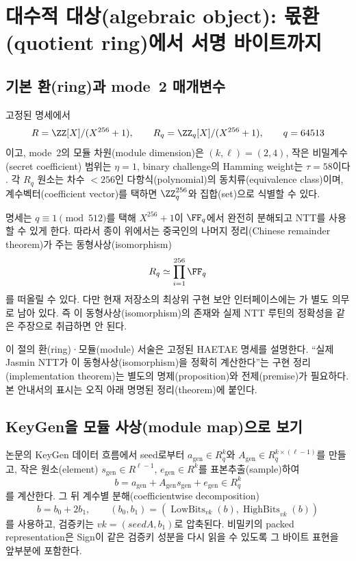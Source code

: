 \section{대수적 대상(algebraic object): 몫환(quotient ring)에서 서명 바이트까지}
\label{sec:algebraic-object}

\subsection{기본 환(ring)과 mode~2 매개변수}

고정된 명세에서
\[
  R=\ZZ[X]/(X^{256}+1),\qquad
  R_q=\ZZ_q[X]/(X^{256}+1),\qquad q=64513
\]
이고, mode~2의 모듈 차원(module dimension)은 \((k,\ell)=(2,4)\), 작은
비밀계수(secret coefficient) 범위는
\(\eta=1\), binary challenge의 Hamming weight는 \(\tau=58\)이다
\cite{haetae-spec}. 각 \(R_q\) 원소는 차수 \(<256\)인 다항식(polynomial)의
동치류(equivalence class)이며, 계수벡터(coefficient vector)를 택하면
\(\ZZ_q^{256}\)와 집합(set)으로 식별할 수 있다.

명세는 \(q\equiv1\pmod{512}\)를 택해 \(X^{256}+1\)이 \(\FF_q\)에서 완전히
분해되고 NTT를 사용할 수 있게 한다. 따라서 종이 위에서는
중국인의 나머지 정리(Chinese remainder theorem)가 주는 동형사상(isomorphism)
\[
  R_q\simeq\prod_{i=1}^{256}\FF_q
\]
를 떠올릴 수 있다. 다만 현재 저장소의 최상위 구현 보안 인터페이스에는
가 별도 의무로 남아 있다. 즉 이
동형사상(isomorphism)의 존재와 실제 NTT 루틴의 정확성을 같은 주장으로
취급하면 안 된다.

\begin{caution}
이 절의 환(ring)·모듈(module) 서술은 고정된 HAETAE 명세를 설명한다. ``실제
Jasmin NTT가 이 동형사상(isomorphism)을 정확히 계산한다''는
구현 정리(implementation theorem)는
별도의 명제(proposition)와 전제(premise)가 필요하다. 본 안내서의
\statusproved 표시는 오직 
아래 명명된 정리(theorem)에 붙인다.
\end{caution}

\subsection{KeyGen을 모듈 사상(module map)으로 보기}

논문의 KeyGen 데이터 흐름에서 seed로부터
\(a_{\mathrm{gen}}\in R_q^k\)와
\(A_{\mathrm{gen}}\in R_q^{k\times(\ell-1)}\)를 만들고,
작은 원소(element)
\(s_{\mathrm{gen}}\in R^{\ell-1}\),
\(e_{\mathrm{gen}}\in R^k\)를 표본추출(sample)하여
\[
  b=a_{\mathrm{gen}}+A_{\mathrm{gen}}s_{\mathrm{gen}}
      +e_{\mathrm{gen}}\in R_q^k
\]
를 계산한다. 그 뒤 계수별 분해(coefficientwise decomposition)
\[
  b=b_0+2b_1,\qquad
  (b_0,b_1)=
  (\operatorname{LowBits}_{vk}(b),
   \operatorname{HighBits}_{vk}(b))
\]
를 사용하고, 검증키는 \(vk=(\mathit{seedA},b_1)\)로 압축된다. 비밀키의
packed representation은 Sign이 같은 검증키 성분을 다시 읽을 수 있도록
그 바이트 표현을 앞부분에 포함한다.

